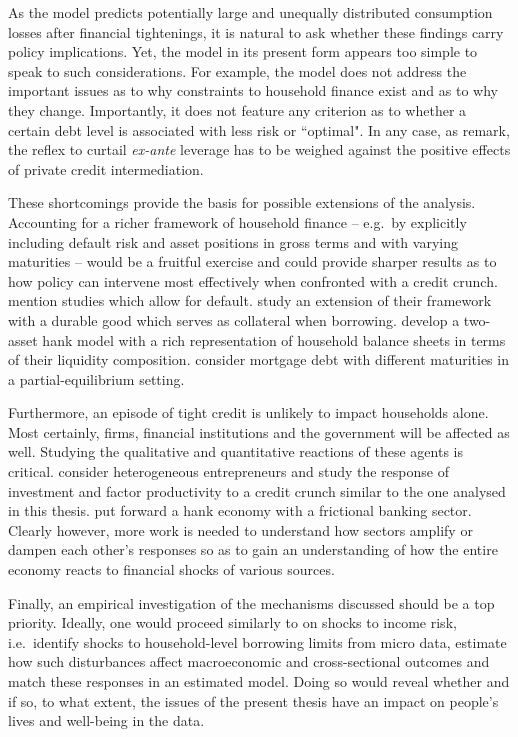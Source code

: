 \documentclass[a4paper,12pt]{article} %
\numberwithin{equation}{section} %
\numberwithin{figure}{section}
\numberwithin{table}{section}
\begin{document}
As the model predicts potentially large and unequally distributed consumption losses after financial tightenings, it is natural to ask whether these findings carry policy implications. Yet, the model in its present form appears too simple to speak to such considerations. For example, the model does not address the important issues as to why constraints to household finance exist and as to why they change. Importantly, it does not feature any criterion as to whether a certain debt level is associated with less risk or ``optimal". In any case, as \textcite{korinek2016} remark, the reflex to curtail \textit{ex-ante} leverage has to be weighed against the positive effects of private credit intermediation. 

These shortcomings provide the basis for possible extensions of the analysis. Accounting for a richer framework of household finance -- e.g.~by explicitly including default risk and asset positions in gross terms and with varying maturities -- would be a fruitful exercise and could provide sharper results as to how policy can intervene most effectively when confronted with a credit crunch. \textcite{heath2009} mention studies which allow for default. \textcite{gl2017} study an extension of their framework with a durable good which serves as collateral when borrowing. \textcite{kaplan2018} develop a two-asset \Gls{hank} model with a rich representation of household balance sheets in terms of their liquidity composition. \textcite{guerrieri2020} consider mortgage debt with different maturities in a partial-equilibrium setting.

Furthermore, an episode of tight credit is unlikely to impact households alone. Most certainly, firms, financial institutions and the government will be affected as well. Studying the qualitative and quantitative reactions of these agents is critical. \textcite{buera2020} consider heterogeneous entrepreneurs and study the response of investment and factor productivity to a credit crunch similar to the one analysed in this thesis. \textcite{lee2021} put forward a \Gls{hank} economy with a frictional banking sector. Clearly however, more work is needed to understand how sectors amplify or dampen each other’s responses so as to gain an understanding of how the entire economy reacts to financial shocks of various sources.

Finally, an empirical investigation of the mechanisms discussed should be a top priority. Ideally, one would proceed similarly to \textcite{bayer2019} on shocks to income risk, i.e.~identify shocks to household-level borrowing limits from micro data, estimate how such disturbances affect macroeconomic and cross-sectional outcomes and match these responses in an estimated model. Doing so would reveal whether and if so, to what extent, the issues of the present thesis have an impact on people's lives and well-being in the data.
\end{document}
